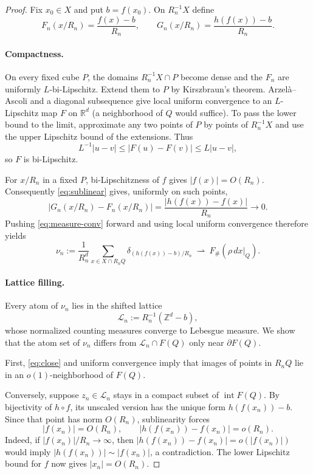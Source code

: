 \documentclass[10pt]{article}
\newcommand{\R}{\mathbb R}
\newcommand{\Z}{\mathbb Z}
\newcommand{\cL}{\mathcal L}
\begin{document}
\begin{proof}
Fix $x_0\in X$ and put $b=f(x_0)$.  On $R_n^{-1}X$ define
\begin{equation}\label{eq:FnGn}
 F_n(x/R_n)=\frac{f(x)-b}{R_n},\qquad
 G_n(x/R_n)=\frac{h(f(x))-b}{R_n}.
\end{equation}

\paragraph{Compactness.}
On every fixed cube $P$, the domains $R_n^{-1}X\cap P$ become dense and the
$F_n$ are uniformly $L$-bi-Lipschitz.  Extend them to $P$ by Kirszbraun's
theorem.  Arzelà--Ascoli and a diagonal subsequence give local uniform
convergence to an $L$-Lipschitz map $F$ on $\R^d$ (a neighborhood of $Q$
would suffice).  To pass the lower bound to the limit, approximate any two
points of $P$ by points of $R_n^{-1}X$ and use the upper Lipschitz bound of
the extensions.  Thus
\begin{equation}\label{eq:bilimit}
 L^{-1}|u-v|\le|F(u)-F(v)|\le L|u-v|,
\end{equation}
so $F$ is bi-Lipschitz.

For $x/R_n$ in a fixed $P$, bi-Lipschitzness of $f$ gives $|f(x)|=O(R_n)$.
Consequently \eqref{eq:sublinear} gives, uniformly on such points,
\begin{equation}\label{eq:close}
 |G_n(x/R_n)-F_n(x/R_n)|
 =\frac{|h(f(x))-f(x)|}{R_n}\longrightarrow0.
\end{equation}
Pushing \eqref{eq:measure-conv} forward and using local uniform convergence
therefore yields
\begin{equation}\label{eq:first-limit}
 \nu_n:=\frac1{R_n^d}\sum_{x\in X\cap R_nQ}
 \delta_{(h(f(x))-b)/R_n}
 \ \rightharpoonup\ F_\#(\rho\,dx|_Q).
\end{equation}

\paragraph{Lattice filling.}
Every atom of $\nu_n$ lies in the shifted lattice
\[
 \cL_n:=R_n^{-1}(\Z^d-b),
\]
whose normalized counting measures converge to Lebesgue measure.  We show
that the atom set of $\nu_n$ differs from $\cL_n\cap F(Q)$ only near
$\partial F(Q)$.

First, \eqref{eq:close} and uniform convergence imply that images of points
in $R_nQ$ lie in an $o(1)$-neighborhood of $F(Q)$.

Conversely, suppose $z_n\in\cL_n$ stays in a compact subset of
$\operatorname{int}F(Q)$.  By bijectivity of $h\circ f$, its unscaled version
has the unique form $h(f(x_n))-b$.  Since that point has norm $O(R_n)$,
sublinearity forces
\begin{equation}\label{eq:reverse-close}
 |f(x_n)|=O(R_n),\qquad |h(f(x_n))-f(x_n)|=o(R_n).
\end{equation}
Indeed, if $|f(x_n)|/R_n\to\infty$, then
$|h(f(x_n))-f(x_n)|=o(|f(x_n)|)$ would imply
$|h(f(x_n))|\sim|f(x_n)|$, a contradiction.  The lower Lipschitz bound for
$f$ now gives $|x_n|=O(R_n)$.


\end{proof}
\end{document}

